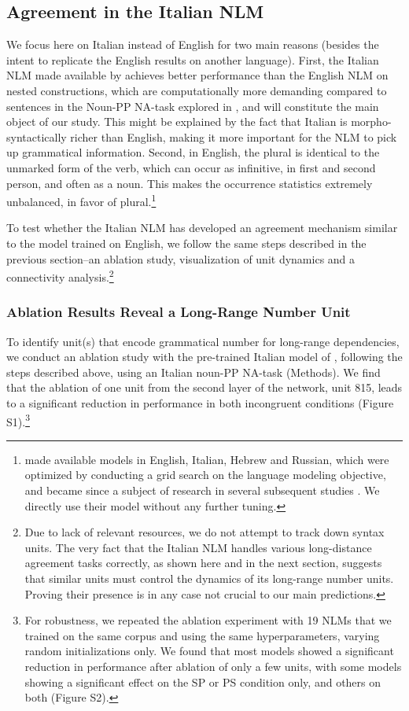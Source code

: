 \subsection{Agreement in the Italian NLM}
We focus here on Italian instead of English for two main reasons (besides the intent to replicate the English results on another language). First, the Italian NLM made available by \citet{Gulordava:etal:2018} achieves better performance than the English NLM on nested constructions, which are computationally more demanding compared to sentences in the Noun-PP NA-task explored in \citet{lakretz2019emergence}, and will constitute the main object of our study. This might be explained by the fact that Italian is morpho-syntactically richer than English, making it more important for the NLM to pick up grammatical information. Second, in English, the plural is identical to the unmarked form of the verb, which can occur as infinitive, in first and second person, and often as a noun. This makes the occurrence statistics extremely unbalanced, in favor of plural.\footnote{\citet{Gulordava:etal:2018} made available models in English, Italian, Hebrew and Russian, which were optimized by conducting a grid search on the language modeling objective, and became since a subject of research in several subsequent studies \citep{Giulianelli:etal:2018, jumelet2019analysing, wilcox2018rnn, futrell2019neural}. We directly use their model without any further tuning.}

To test whether the Italian NLM has developed an agreement mechanism similar to the model trained on English, we follow the same steps described in the previous section--an ablation study, visualization of unit dynamics and a connectivity analysis.\footnote{Due to lack of relevant resources, we do not attempt to track down syntax units. The very fact that the Italian NLM handles various long-distance agreement tasks correctly, as shown here and in the next section, suggests that similar units must control the dynamics of its long-range number units. Proving their presence is in any case not crucial to our main predictions.}

\subsubsection{Ablation Results Reveal a Long-Range Number Unit} To identify unit(s) that encode grammatical number for long-range dependencies, we conduct an ablation study with the pre-trained Italian model of \citet{Gulordava:etal:2018}, following the steps described above, using an Italian noun-PP NA-task (Methods). 
We find that the ablation of one unit from the second layer of the network, unit 815, leads to a significant reduction in performance in both incongruent conditions (Figure S1).\footnote{For robustness, we repeated the ablation experiment with 19 NLMs that we trained on the same corpus and using the same hyperparameters, varying random initializations only. We found that most models showed a significant reduction in performance after ablation of only a few units, with some models showing a significant effect on the SP or PS condition only, and others on both (Figure S2).}

